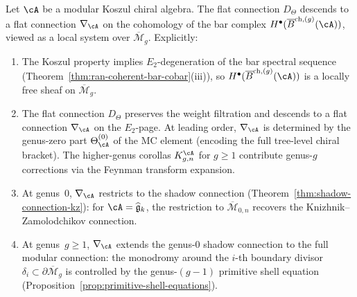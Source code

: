\begin{theorem}
\label{thm:primitive-flat-descent}
Let $\cA$ be a modular Koszul chiral algebra.  The flat
connection $D_\Theta$ descends to a flat connection
$\nabla_\cA$ on the cohomology of the bar complex
$H^\bullet(\overline{B}^{\mathrm{ch},(g)}(\cA))$, viewed as a local system over
$\overline{\mathcal{M}}_g$.  Explicitly:
\begin{enumerate}[label=\textup{(\roman*)}]
\item The Koszul property implies $E_2$-degeneration of the
  bar spectral sequence
  (Theorem~\ref{thm:ran-coherent-bar-cobar}\textup{(iii)}),
  so $H^\bullet(\overline{B}^{\mathrm{ch},(g)}(\cA))$ is a locally free sheaf
  on $\overline{\mathcal{M}}_g$.
\item The flat connection $D_\Theta$ preserves the
  weight filtration and descends to a flat connection
  $\nabla_\cA$ on the $E_2$-page.  At leading order,
  $\nabla_\cA$ is determined by the genus-zero part
  $\Theta_\cA^{(0)}$ of the MC element (encoding the full
  tree-level chiral bracket).  The higher-genus corollas
  $K_{g,n}^\cA$ for $g \geq 1$ contribute genus-$g$
  corrections via the Feynman transform expansion.
\item At genus~$0$, $\nabla_\cA$ restricts to the
  shadow connection
  (Theorem~\ref{thm:shadow-connection-kz}): for
  $\cA = \widehat{\mathfrak{g}}_k$, the restriction to
  $\overline{\mathcal{M}}_{0,n}$ recovers the
  Knizhnik--Zamolodchikov connection.
\item At genus~$g \geq 1$, $\nabla_\cA$ extends the genus-$0$
  shadow connection to the full modular connection: the monodromy
  around the $i$-th boundary divisor $\delta_i \subset
  \partial\overline{\mathcal{M}}_g$ is controlled by the
  genus-$(g-1)$ primitive shell equation
  (Proposition~\ref{prop:primitive-shell-equations}).
\end{enumerate}
\end{theorem}

